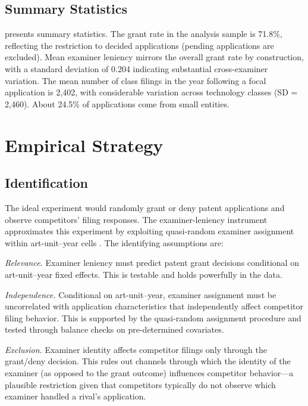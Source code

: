 \documentclass[12pt]{article}
\begin{document}
\subsection{Summary Statistics}



 presents summary statistics. The grant rate in the analysis sample is 71.8\%, reflecting the restriction to decided applications (pending applications are excluded). Mean examiner leniency mirrors the overall grant rate by construction, with a standard deviation of 0.204 indicating substantial cross-examiner variation. The mean number of class filings in the year following a focal application is 2,402, with considerable variation across technology classes (SD = 2,460). About 24.5\% of applications come from small entities.


\section{Empirical Strategy}

\subsection{Identification}

The ideal experiment would randomly grant or deny patent applications and observe competitors' filing responses. The examiner-leniency instrument approximates this experiment by exploiting quasi-random examiner assignment within art-unit--year cells \citep{farre2020, chyn2024}. The identifying assumptions are:

\emph{Relevance.} Examiner leniency must predict patent grant decisions conditional on art-unit--year fixed effects. This is testable and holds powerfully in the data.

\emph{Independence.} Conditional on art-unit--year, examiner assignment must be uncorrelated with application characteristics that independently affect competitor filing behavior. This is supported by the quasi-random assignment procedure and tested through balance checks on pre-determined covariates.

\emph{Exclusion.} Examiner identity affects competitor filings only through the grant/deny decision. This rules out channels through which the identity of the examiner (as opposed to the grant outcome) influences competitor behavior---a plausible restriction given that competitors typically do not observe which examiner handled a rival's application.
\end{document}
